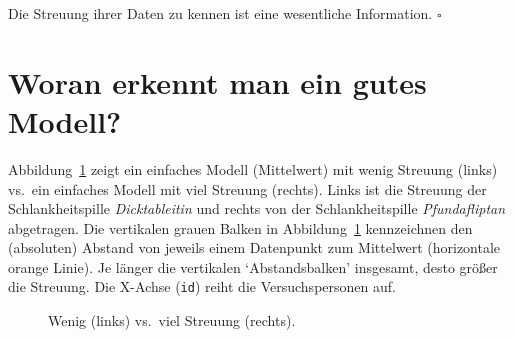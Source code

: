 \documentclass[
  letterpaper,
  oneside,
  open=any]{scrbook}
\theoremstyle{definition}
\theoremstyle{definition}
\theoremstyle{definition}
\theoremstyle{remark}
\begin{document}
\begin{tcolorbox}[enhanced jigsaw, bottomrule=.15mm, left=2mm, colbacktitle=quarto-callout-important-color!10!white, bottomtitle=1mm, colframe=quarto-callout-important-color-frame, coltitle=black, rightrule=.15mm, breakable, toptitle=1mm, titlerule=0mm, title=\textcolor{quarto-callout-important-color}{\faExclamation}\hspace{0.5em}{Wichtig}, opacitybacktitle=0.6, arc=.35mm, colback=white, leftrule=.75mm, opacityback=0, toprule=.15mm]

Die Streuung ihrer Daten zu kennen ist eine wesentliche Information.
\(\square\)

\end{tcolorbox}

\section{Woran erkennt man ein gutes
Modell?}\label{woran-erkennt-man-ein-gutes-modell}

Abbildung~\ref{fig-streuung} zeigt ein einfaches Modell (Mittelwert) mit
wenig Streuung (links) vs.~ein einfaches Modell mit viel Streuung
(rechts). Links ist die Streuung der Schlankheitspille
\emph{Dicktableitin} und rechts von der Schlankheitspille
\emph{Pfundafliptan} abgetragen. Die vertikalen grauen Balken in
Abbildung~\ref{fig-streuung} kennzeichnen den (absoluten) Abstand von
jeweils einem Datenpunkt zum Mittelwert (horizontale orange Linie). Je
länger die vertikalen \enquote*{Abstandsbalken} insgesamt, desto größer
die Streuung. Die X-Achse (\texttt{id}) reiht die Versuchspersonen auf.

\begin{figure}


\caption{\label{fig-streuung}Wenig (links) vs.~viel Streuung (rechts).}

\end{figure}%
\end{document}
